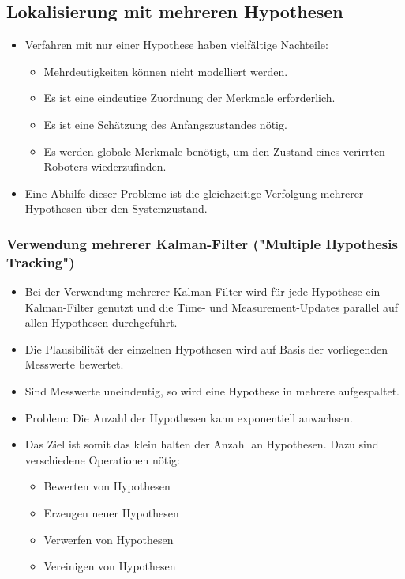 		\subsection{Lokalisierung mit mehreren Hypothesen}
			\begin{itemize}
				\item Verfahren mit nur einer Hypothese haben vielfältige Nachteile:
					\begin{itemize}
						\item Mehrdeutigkeiten können nicht modelliert werden.
						\item Es ist eine eindeutige Zuordnung der Merkmale erforderlich.
						\item Es ist eine Schätzung des Anfangszustandes nötig.
						\item Es werden globale Merkmale benötigt, um den Zustand eines verirrten Roboters wiederzufinden.
					\end{itemize}
				\item Eine Abhilfe dieser Probleme ist die gleichzeitige Verfolgung mehrerer Hypothesen über den Systemzustand.
			\end{itemize}

			\subsubsection{Verwendung mehrerer Kalman-Filter ("Multiple Hypothesis Tracking")}
				\begin{itemize}
					\item Bei der Verwendung mehrerer Kalman-Filter wird für jede Hypothese ein Kalman-Filter genutzt und die Time- und Measurement-Updates parallel auf allen Hypothesen durchgeführt.
					\item Die Plausibilität der einzelnen Hypothesen wird auf Basis der vorliegenden Messwerte bewertet.
					\item Sind Messwerte uneindeutig, so wird eine Hypothese in mehrere aufgespaltet.
					\item Problem: Die Anzahl der Hypothesen kann exponentiell anwachsen.
					\item Das Ziel ist somit das klein halten der Anzahl an Hypothesen. Dazu sind verschiedene Operationen nötig:
						\begin{itemize}
							\item Bewerten von Hypothesen
							\item Erzeugen neuer Hypothesen
							\item Verwerfen von Hypothesen
							\item Vereinigen von Hypothesen
						\end{itemize}
				\end{itemize}
			
